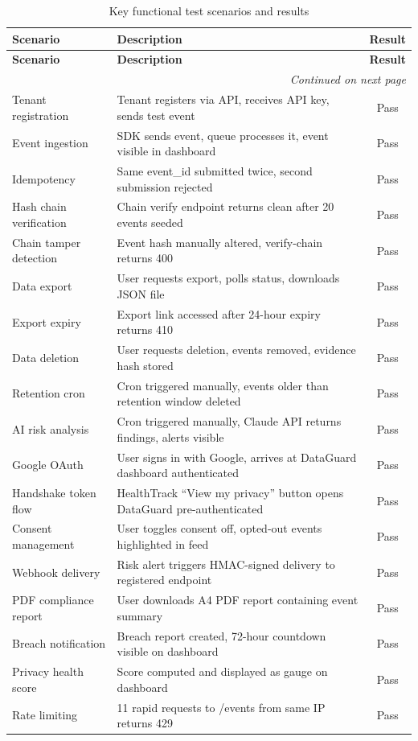 \documentclass[a4paper,12pt,onecolumn]{report}
\begin{document}
\begin{longtable}{|p{4cm}|p{6.5cm}|c|}
    \caption{Key functional test scenarios and results}
    \label{tab:test-scenarios} \\
    \hline
    \textbf{Scenario} & \textbf{Description} & \textbf{Result} \\
    \hline
    \endfirsthead
    \hline
    \textbf{Scenario} & \textbf{Description} & \textbf{Result} \\
    \hline
    \endhead
    \hline
    \multicolumn{3}{r}{\small\textit{Continued on next page}} \\
    \endfoot
    \hline
    \endlastfoot
    Tenant registration & Tenant registers via API, receives API key, sends test event & Pass \\
    \hline
    Event ingestion & SDK sends event, queue processes it, event visible in dashboard & Pass \\
    \hline
    Idempotency & Same event\_id submitted twice, second submission rejected & Pass \\
    \hline
    Hash chain verification & Chain verify endpoint returns clean after 20 events seeded & Pass \\
    \hline
    Chain tamper detection & Event hash manually altered, verify-chain returns 400 & Pass \\
    \hline
    Data export & User requests export, polls status, downloads JSON file & Pass \\
    \hline
    Export expiry & Export link accessed after 24-hour expiry returns 410 & Pass \\
    \hline
    Data deletion & User requests deletion, events removed, evidence hash stored & Pass \\
    \hline
    Retention cron & Cron triggered manually, events older than retention window deleted & Pass \\
    \hline
    AI risk analysis & Cron triggered manually, Claude API returns findings, alerts visible & Pass \\
    \hline
    Google OAuth & User signs in with Google, arrives at DataGuard dashboard authenticated & Pass \\
    \hline
    Handshake token flow & HealthTrack ``View my privacy'' button opens DataGuard pre-authenticated & Pass \\
    \hline
    Consent management & User toggles consent off, opted-out events highlighted in feed & Pass \\
    \hline
    Webhook delivery & Risk alert triggers HMAC-signed delivery to registered endpoint & Pass \\
    \hline
    PDF compliance report & User downloads A4 PDF report containing event summary & Pass \\
    \hline
    Breach notification & Breach report created, 72-hour countdown visible on dashboard & Pass \\
    \hline
    Privacy health score & Score computed and displayed as gauge on dashboard & Pass \\
    \hline
    Rate limiting & 11 rapid requests to /events from same IP returns 429 & Pass \\
    \hline
\end{longtable}
\end{document}
